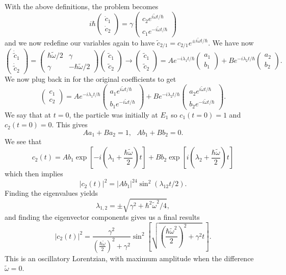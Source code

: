 \documentclass[fontsize=12pt]{scrartcl}
\begin{document}
With the above definitions, the problem becomes $$ i\hbar\left(\begin{matrix}
\dot{c}_1\\\dot{c}_2
\end{matrix}\right) =\gamma \left(\begin{matrix}
c_2e^{i\tilde{\omega}t/\hbar}\\c_1e^{-i\tilde{\omega}t/\hbar}
\end{matrix}\right) $$ and we now redefine our variables again to have $\tilde{c}_{2/1}=c_{2/1}e^{\pm i \tilde{\omega}t/\hbar}$. We have now $$\left(\begin{matrix}
\dot{\tilde{c}}_1\\\dot{\tilde{c}}_2
\end{matrix}\right)=\left(\begin{matrix}
\hbar\tilde{\omega}/2 & \gamma \\ \gamma & -\hbar\tilde{\omega}/2
\end{matrix}\right)\left(\begin{matrix}
\tilde{c}_1\\\tilde{c}_2
\end{matrix}\right)\to \left(\begin{matrix}
\tilde{c}_1\\\tilde{c}_2
\end{matrix}\right) = Ae^{-i\lambda_1t/\hbar} \left(\begin{matrix}
a_1\\ b_1
\end{matrix}\right) + Be^{-i\lambda_2t/\hbar}\left(\begin{matrix}
a_2\\ b_2
\end{matrix}\right) .$$ We now plug back in for the original coefficients to get $$\left(\begin{matrix}
c_1\\ c_2
\end{matrix}\right) = Ae^{-i\lambda_1t/\hbar} \left(\begin{matrix}
a_1e^{i\tilde{\omega}t/\hbar}\\ b_1e^{-i\tilde{\omega}t/\hbar}
\end{matrix}\right) + Be^{-i\lambda_2t/\hbar}\left(\begin{matrix}
a_2e^{i\tilde{\omega}t/\hbar}\\ b_2e^{-i\tilde{\omega}t/\hbar}
\end{matrix}\right). $$ We say that at $t=0$, the particle was initially at $E_1$ so $c_1(t=0)=1$ and $c_2(t=0)=0$. This gives $$Aa_1+Ba_2=1, \ \ \ Ab_1+Bb_2=0.$$ We see that $$c_2(t)=Ab_1\exp\left[-i(\lambda_1+\frac{\hbar\tilde{\omega}}{2})t\right]+Bb_2\exp\left[i(\lambda_2+\frac{\hbar\tilde{\omega}}{2})t\right]$$ which then implies $$|c_2(t)|^2=|Ab_1|^24\sin^2(\lambda_{12}t/2).$$ Finding the eigenvalues yields $$\lambda_{1,2}=\pm\sqrt{\gamma^2+\hbar^2\tilde{\omega}^2/4},$$ and finding the eigenvector components gives us a final results $$|c_2(t)|^2=\frac{\gamma^2}{\left(\frac{\hbar\tilde{\omega}}{2}\right)^2+\gamma^2}\sin^2\left[\sqrt{\left(\frac{\hbar\tilde{\omega}^2}{2}\right)^2+\gamma^2}t\right].$$ This is an oscillatory Lorentzian, with maximum amplitude when the difference $\tilde{\omega}=0$.
\end{document}
